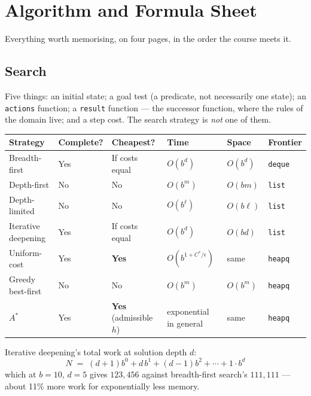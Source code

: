 \chapter{Algorithm and Formula Sheet}\label{app:algorithms}
\normalfigures

Everything worth memorising, on four pages, in the order the course meets it.

\section{Search}

\begin{definitionbox}
Five things: an initial state; a goal test (a predicate, not necessarily one
state); an \texttt{actions} function; a \texttt{result} function --- the successor
function, where the rules of the domain live; and a step cost. The search strategy
is \emph{not} one of them.
\end{definitionbox}

\begin{longtable}{@{}L{2.6cm}L{2.05cm}L{1.95cm}L{2.5cm}L{1.85cm}L{1.85cm}@{}}
\toprule
{}
\textbf{Strategy} & \textbf{Complete?} & \textbf{Cheapest?} & \textbf{Time} &
\textbf{Space} & \textbf{Frontier} \\
\midrule
\endhead
Breadth-first & Yes & If costs equal & $O(b^{d})$ & $O(b^{d})$ & \texttt{deque} \\
Depth-first & No & No & $O(b^{m})$ & $O(bm)$ & \texttt{list} \\
Depth-limited & No & No & $O(b^{\ell})$ & $O(b\ell)$ & \texttt{list} \\
Iterative deepening & Yes & If costs equal & $O(b^{d})$ & $O(bd)$ &
\texttt{list} \\
Uniform-cost & Yes & \textbf{Yes} & $O(b^{1+C^{*}/\epsilon})$ & same &
\texttt{heapq} \\
Greedy best-first & No & No & $O(b^{m})$ & $O(b^{m})$ & \texttt{heapq} \\
$A^{*}$ & Yes & \textbf{Yes} (admissible $h$) & exponential in general & same &
\texttt{heapq} \\
\bottomrule
\end{longtable}

Iterative deepening's total work at solution depth $d$:
\[
  N \;=\; (d+1)b^{0} + d\,b^{1} + (d-1)b^{2} + \cdots + 1\cdot b^{d}
\]
which at $b = 10$, $d = 5$ gives $123{,}456$ against breadth-first search's
$111{,}111$ --- about 11\% more work for exponentially less memory.

